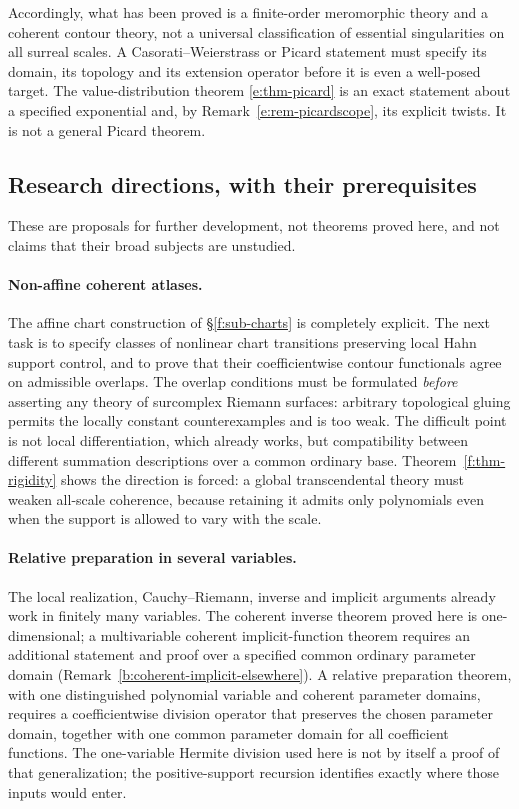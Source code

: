 \documentclass[11pt,a4paper]{article}
\numberwithin{equation}{section}
\theoremstyle{definition}
\theoremstyle{remark}
\theoremstyle{plain}
\begin{document}
Accordingly, what has been proved is a finite-order meromorphic theory
and a coherent contour theory, not a universal classification of
essential singularities on all surreal scales.  A Casorati--Weierstrass
or Picard statement must specify its domain, its topology and its
extension operator before it is even a well-posed target.  The
value-distribution theorem \ref{e:thm-picard} is an exact statement
about a specified exponential and, by Remark~\ref{e:rem-picardscope},
its explicit twists. It is not a general Picard theorem.

\subsection{Research directions, with their prerequisites}
\label{f:sub-directions}

These are proposals for further development, not theorems proved here,
and not claims that their broad subjects are unstudied.

\paragraph{Non-affine coherent atlases.}
The affine chart construction of \S\ref{f:sub-charts} is completely
explicit.  The next task is to specify classes of nonlinear chart
transitions preserving local Hahn support control, and to prove that
their coefficientwise contour functionals agree on admissible overlaps.
The overlap conditions must be formulated \emph{before} asserting any
theory of surcomplex Riemann surfaces: arbitrary topological gluing
permits the locally constant counterexamples and is too weak.  The
difficult point is not local differentiation, which already works, but
compatibility between different summation descriptions over a common
ordinary base.  Theorem~\ref{f:thm-rigidity} shows the direction is
forced: a global transcendental theory must weaken all-scale coherence,
because retaining it admits only polynomials even when the support
is allowed to vary with the scale.

\paragraph{Relative preparation in several variables.}
The local realization, Cauchy--Riemann, inverse and implicit arguments
already work in finitely many variables. The coherent inverse theorem
proved here is one-dimensional; a multivariable coherent
implicit-function theorem requires an additional statement and proof
over a specified common ordinary parameter domain
(Remark~\ref{b:coherent-implicit-elsewhere}).  A relative preparation theorem,
with one distinguished polynomial variable and coherent parameter
domains, requires a coefficientwise division operator that preserves the
chosen parameter domain, together with one common parameter domain for
all coefficient functions.  The one-variable Hermite division used here
is not by itself a proof of that generalization; the positive-support
recursion identifies exactly where those inputs would enter.
\end{document}
